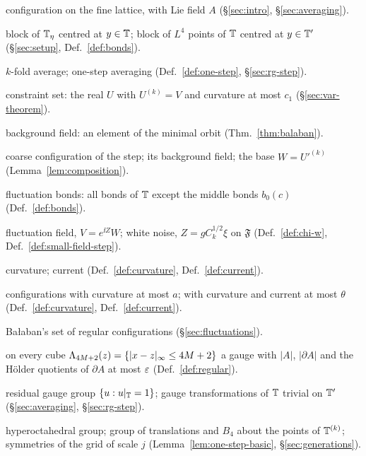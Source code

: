 {\small
\begin{description}[font=\normalfont,style=nextline,leftmargin=10em,labelwidth=9.5em,labelsep=0.5em,itemsep=1pt,parsep=0pt,topsep=4pt]
\item[$U=e^{\ii\eta A}$] configuration on the fine lattice, with Lie field $A$ (\S\ref{sec:intro}, \S\ref{sec:averaging}).
\item[$B(y)$, $B'(y)$] block of $\mathbb T_\eta$ centred at $y\in\mathbb T$; block of $L^4$ points of $\mathbb T$ centred at $y\in\mathbb T'$ (\S\ref{sec:setup}, Def.~\ref{def:bonds}).
\item[$U^{(k)}$, $\mathfrak a'$] $k$-fold average; one-step averaging (Def.~\ref{def:one-step}, \S\ref{sec:rg-step}).
\item[$\mathfrak B(V)$] constraint set: the real $U$ with $U^{(k)}=V$ and curvature at most $c_1$ (\S\ref{sec:var-theorem}).
\item[$U_k(V)$] background field: an element of the minimal orbit (Thm.~\ref{thm:balaban}).
\item[$V'$, $U'$, $W$] coarse configuration of the step; its background field; the base $W=U'^{(k)}$ (Lemma~\ref{lem:composition}).
\item[$\mathfrak F$, $b_0(c)$] fluctuation bonds: all bonds of $\mathbb T$ except the middle bonds $b_0(c)$ (Def.~\ref{def:bonds}).
\item[$Z$, $\xi$] fluctuation field, $V=e^{\ii Z}W$; white noise, $Z=gC_k^{1/2}\xi$ on $\mathfrak F$ (Def.~\ref{def:chi-w}, Def.~\ref{def:small-field-step}).
\item[$F_Y(p)$, $J_U$] curvature; current (Def.~\ref{def:curvature}, Def.~\ref{def:current}).
\item[$\mathfrak U_j(a)$, $\mathfrak U(\theta)$] configurations with curvature at most $a$; with curvature and current at most $\theta$ (Def.~\ref{def:curvature}, Def.~\ref{def:current}).
\item[$\mathfrak M$] Ba\l aban's set of regular configurations (\S\ref{sec:fluctuations}).
\item[$(M,\eps)$-regular] on every cube $\Lambda_{4M+2}(z)=\{|x-z|_\infty\le4M+2\}$ a gauge with $|A|$, $|\partial A|$ and the H\"older quotients of $\partial A$ at most $\varepsilon$ (Def.~\ref{def:regular}).
\item[$\mathfrak G_0$, $\mathcal G'$] residual gauge group $\{u:u|_\mathbb T=1\}$; gauge transformations of $\mathbb T$ trivial on $\mathbb T'$ (\S\ref{sec:averaging}, \S\ref{sec:rg-step}).
\item[$B_4$, $\mathfrak S_k$, $\mathfrak S^{\rm grid}_j$] hyperoctahedral group; group of translations and $B_4$ about the points of $\mathbb T^{(k)}$; symmetries of the grid of scale $j$ (Lemma~\ref{lem:one-step-basic}, \S\ref{sec:generations}).

\end{description}}
